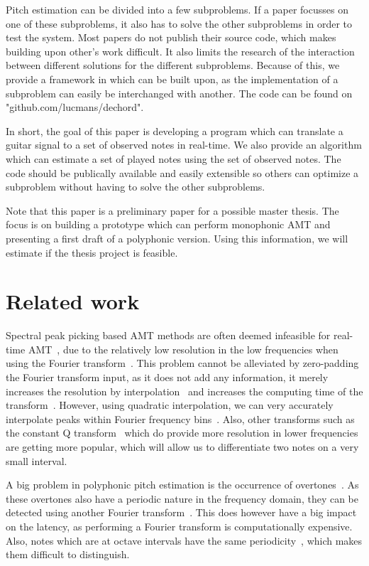 \documentclass[10pt,twocolumn]{article}
\begin{document}
Pitch estimation can be divided into a few subproblems. If a paper focusses on one of these subproblems, it also has to solve the other subproblems in order to test the system. Most papers do not publish their source code, which makes building upon other's work difficult. It also limits the research of the interaction between different solutions for the different subproblems. Because of this, we provide a framework in which can be built upon, as the implementation of a subproblem can easily be interchanged with another. The code can be found on "github.com/lucmans/dechord".

In short, the goal of this paper is developing a program which can translate a guitar signal to a set of observed notes in real-time. We also provide an algorithm which can estimate a set of played notes using the set of observed notes. The code should be publically available and easily extensible so others can optimize a subproblem without having to solve the other subproblems.

Note that this paper is a preliminary paper for a possible master thesis. The focus is on building a prototype which can perform monophonic AMT and presenting a first draft of a polyphonic version. Using this information, we will estimate if the thesis project is feasible.


\section{Related work}
Spectral peak picking based AMT methods are often deemed infeasible for real-time AMT~\cite{hater}, due to the relatively low resolution in the low frequencies when using the Fourier transform~\cite{theoretisch}. This problem cannot be alleviated by zero-padding the Fourier transform input, as it does not add any information, it merely increases the resolution by interpolation~\cite{infomax}\cite{infomax2} and increases the computing time of the transform~\cite{boek}. However, using quadratic interpolation, we can very accurately interpolate peaks within Fourier frequency bins~\cite{interpol}. Also, other transforms such as the constant Q transform~\cite{cqt} which do provide more resolution in lower frequencies are getting more popular, which will allow us to differentiate two notes on a very small interval.

A big problem in polyphonic pitch estimation is the occurrence of overtones~\cite{oud}. As these overtones also have a periodic nature in the frequency domain, they can be detected using another Fourier transform~\cite{double}. This does however have a big impact on the latency, as performing a Fourier transform is computationally expensive. Also, notes which are at octave intervals have the same periodicity~\cite{octave}, which makes them difficult to distinguish.
\end{document}
